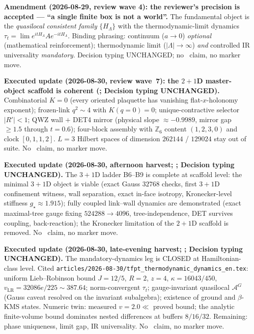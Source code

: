 \documentclass[11pt,a4paper]{article}
\begin{document}
\par\smallskip\noindent\textbf{Amendment (2026-08-29, review wave 4): the reviewer's precision
is accepted --- ``a single finite box is not a world''.}
The fundamental object is the \emph{quasilocal consistent family} $\{H_\Lambda\}$ with the
thermodynamic-limit dynamics
$\tau_t=\lim e^{itH_\Lambda}A e^{-itH_\Lambda}$.
Binding phrasing: continuum ($a\to0$) \emph{optional} (mathematical reinforcement);
thermodynamic limit ($|\Lambda|\to\infty$) \emph{and} controlled IR universality
\emph{mandatory}.  Decision typing UNCHANGED; no \mE\ claim, no marker move.

\par\smallskip\noindent\textbf{Executed update (2026-08-30, review wave~7): the $2{+}1$D
master-object scaffold is coherent
(; Decision
typing UNCHANGED).}
Combinatorial $K=0$ (every oriented plaquette has vanishing flat-$x$-holonomy exponent);
frozen-link $q^2\sim4$ with $K(q=0)=0$; unique-contractive selector $\lvert R'\rvert<1$;
QWZ wall $+$ DET4 mirror (physical slope $\approx-0.9989$, mirror gap $\ge1.5$ through
$t=0.6$); four-block assembly with $\mathbb Z_6$ content $(1,2,3,0)$ and clock
$[0,1,1,2]$.  $L=3$ Hilbert spaces of dimension $262144$ / $129024$ stay out of suite.
No \mE\ claim, no marker move.

\par\smallskip\noindent\textbf{Executed update (2026-08-30, afternoon harvest;
;
Decision typing UNCHANGED).}
The $3{+}1$D ladder B6--B9 is complete at scaffold level: the minimal $3{+}1$D object is
viable (exact Gauss $32768$ checks, first $3{+}1$D confinement witness, wall separation,
exact in-face isotropy, Kronecker-level stiffness $g_\star\approx1.915$); fully coupled
link--wall dynamics are demonstrated (exact maximal-tree gauge fixing
$524288\to4096$, tree-independence, DET survives coupling, back-reaction); the Kronecker
limitation of the $2{+}1$D scaffold is removed.  No \mE\ claim, no marker move.

\par\smallskip\noindent\textbf{Executed update (2026-08-30, late-evening harvest;
;
Decision typing UNCHANGED).}
The mandatory-dynamics leg is CLOSED at Hamiltonian-class level.  Cited
\texttt{articles/2026-08-30/tfpt\_thermodynamic\_dynamics\_en.tex}: uniform Lieb--Robinson
bound $J=12/5$, $R=2$, $z=4$, $\kappa=16043/450$, $v_{\mathrm{LR}}=32086e/225\sim387.64$;
norm-convergent $\tau_t$; gauge-invariant quasilocal $\mathcal A^G$ (Gauss caveat resolved
on the invariant subalgebra); existence of ground and $\beta$-KMS states.  Numeric twin:
measured $v=2.0\ll$ proved bound; the analytic finite-volume bound dominates nested
differences at buffers $8/16/32$.  Remaining: phase uniqueness, limit gap, IR universality.
No \mE\ claim, no marker move.
\end{document}
